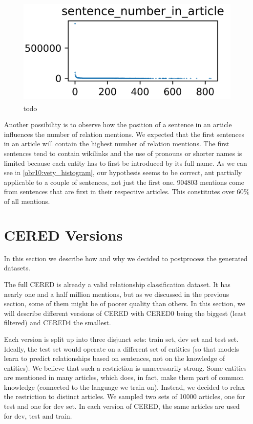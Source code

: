 \begin{figure}[h]\centering
\includegraphics[width=119mm, height=54mm]{./img/CERED0_sentence_number_histogram}
\caption{todo}
\label{obr10:vety_histogram}
\end{figure}


Another possibility is to observe how the position of a sentence in an article influences the number of relation mentions. We expected that the first sentences in an article will contain the highest number of relation mentions. The first sentences tend to contain wikilinks and the use of pronouns or shorter names is limited because each entity has to first be introduced by its full name. As we can see in \autoref{obr10:vety_histogram}, our hypothesis seems to be correct, ant partially applicable to a couple of sentences, not just the first one. 904803 mentions come from sentences that are first in their respective articles. This constitutes over 60\% of all mentions.





\section{CERED Versions}
In this section we describe how and why we decided to postprocess the generated datasets. 

The full CERED is already a valid relationship classification dataset. It has nearly one and a half million mentions, but as we discussed in the previous section, some of them might be of poorer quality than others. In this section, we will describe different versions of CERED with CERED0 being the biggest (least filtered) and CERED4 the smallest. 


Each version is split up into three disjunct sets: train set, dev set and test set. Ideally, the test set would operate on a different set of entities (so that models learn to predict relationships based on sentences, not on the knowledge of entities). We believe that such a restriction is unnecessarily strong. Some entities are mentioned in many articles, which does, in fact, make them part of common knowledge (connected to the language we train on). Instead, we decided to relax the restriction to distinct articles. We sampled two sets of 10000 articles, one for test and one for dev set. In each version of CERED, the same articles are used for dev, test and train.
